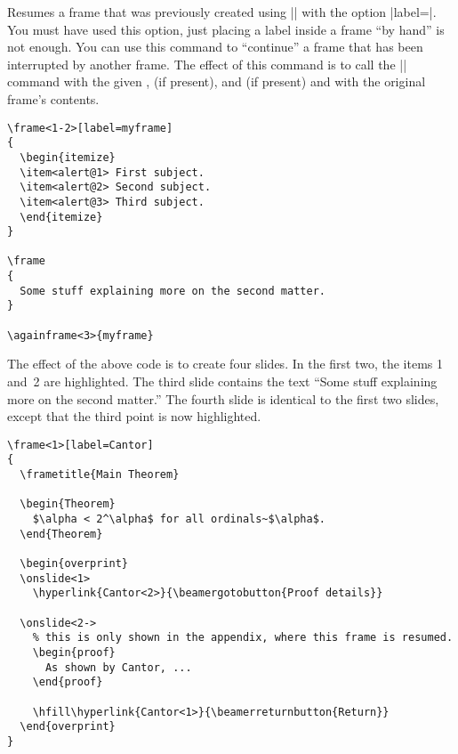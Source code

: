 \begin{command}{\againframe{}}
  \beamernote
  Resumes a frame that was previously created using |\frame| with the option |label=|. You must have used this option, just placing a label inside a frame ``by hand'' is not enough. You can use this command to ``continue'' a frame that has been interrupted by another frame. The effect of this command is to call the |\frame| command with the given ,  (if present), and  (if present) and with the original frame's contents.

  \example
\begin{verbatim}
\frame<1-2>[label=myframe]
{
  \begin{itemize}
  \item<alert@1> First subject.
  \item<alert@2> Second subject.
  \item<alert@3> Third subject.
  \end{itemize}
}

\frame
{
  Some stuff explaining more on the second matter.
}

\againframe<3>{myframe}
\end{verbatim}

  The effect of the above code is to create four slides. In the first two, the items 1 and~2 are highlighted. The third slide contains the text ``Some stuff explaining more on the second matter.'' The fourth slide is identical to the first two slides, except that the third point is now highlighted.

  \example
\begin{verbatim}
\frame<1>[label=Cantor]
{
  \frametitle{Main Theorem}

  \begin{Theorem}
    $\alpha < 2^\alpha$ for all ordinals~$\alpha$.
  \end{Theorem}

  \begin{overprint}
  \onslide<1>
    \hyperlink{Cantor<2>}{\beamergotobutton{Proof details}}

  \onslide<2->
    % this is only shown in the appendix, where this frame is resumed.
    \begin{proof}
      As shown by Cantor, ...
    \end{proof}

    \hfill\hyperlink{Cantor<1>}{\beamerreturnbutton{Return}}
  \end{overprint}
}


\end{verbatim}
\end{command}
